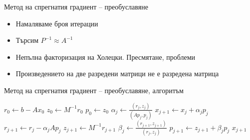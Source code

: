 \documentclass{beamer}
\begin{document}
\iftrue
\begin{frame}{Метод на спрегнатия градиент -- преобуславяне}
	\begin{itemize}[<+->]
		\item Намаляваме броя итерации
		\item Търсим $P^{-1} \approx A^{-1}$
		\item Непълна факторизация на Холецки. Пресмятане, проблеми
		\item Произведението на две разредени матрици не е разредена матрица
	\end{itemize}
\end{frame}
\begin{frame}{Метод на спрегнатия градиент -- преобуславяне, алгоритъм}
\begin{algorithm}[H]
\centering
{}
\caption{Преобусловен метод на спрегнатия градиент за решаване на $Ax=b$ с начално приближение $x_0$}\label{alg:pcg}
\begin{algorithmic}[1]
			\State $r_0 \gets b - Ax_0$
			\State $z_0 \gets M^{-1}r_0$\label{alg-line:apply-preconditioner}
			\State $p_0 \gets z_0$
				\State $\alpha_j \gets \frac{(r_j, z_j)}{(Ap_j, p_j)}$
				\State $x_{j+1} \gets x_j + \alpha_j p_j$
				\State $r_{j+1} \gets r_j - \alpha_j Ap_j$
				\State $z_{j+1} \gets M^{-1}r_{j+1}$
				\State $\beta_j \gets \frac{(r_{j+1}, z_{j+1})}{(r_j, z_j)}$
				\State $p_{j+1} \gets z_{j+1} + \beta_j p_j$
			\EndFor
			\State \Return $x_{j+1}$
		\EndProcedure
\end{algorithmic}
\end{algorithm}
\end{frame}
\end{document}
